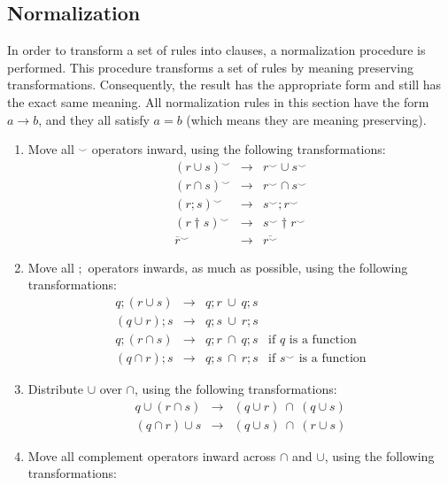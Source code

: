 \documentclass[11pt,a4paper,fleqn,oneside]{article}
\newcommand{\flip}[1]{{#1}^\smallsmile}
\newcommand{\cmpl}[1]{\overline{#1}}
\newcommand{\compose}{;}
\begin{document}
\subsection{Normalization}
	In order to transform a set of rules into clauses,
	a normalization procedure is performed.
	This procedure transforms a set of rules by meaning preserving transformations.
	Consequently, the result has the appropriate form and still has the exact same meaning.
	All normalization rules in this section have the form $a\rightarrow b$,
	and they all satisfy $a=b$ (which means they are meaning preserving).
\begin{enumerate}
\item	Move all $\flip{}$ operators inward, using the following transformations:
  \[\begin{array}{rcl}
	\flip{(r\cup s)}&\rightarrow&\flip{r}\cup\flip{s}\\
	\flip{(r\cap s)}&\rightarrow&\flip{r}\cap\flip{s}\\
	\flip{(r\compose s)}&\rightarrow&\flip{s}\compose\flip{r}\\
	\flip{(r\dagger s)}&\rightarrow&\flip{s}\dagger\flip{r}\\
	\flip{\cmpl{r}}&\rightarrow&\cmpl{\flip{r}}
  \end{array}\]
\item	Move all $\compose$ operators inwards, as much as possible, using the following transformations:
  \[\begin{array}{rcll}
	q\compose(r\cup s)&\rightarrow&q\compose r\ \cup\ q\compose s\\
	(q\cup r)\compose s&\rightarrow&q\compose s\ \cup\ r\compose s\\
	q\compose(r\cap s)&\rightarrow&q\compose r\ \cap\ q\compose s&\text{if $q$ is a function}\\
	(q\cap r)\compose s&\rightarrow&q\compose s\ \cap\ r\compose s&\text{if $\flip{s}$ is a function}
  \end{array}\]
\item	Distribute $\cup$ over $\cap$, using the following transformations:
  \[\begin{array}{rcl}
	q\cup(r\cap s)&\rightarrow&(q\cup r)\ \cap\ (q\cup s)\\
	(q\cap r)\cup s&\rightarrow&(q\cup s)\ \cap\ (r\cup s)
  \end{array}\]
\item	Move all complement operators inward across $\cap$ and $\cup$, using the following transformations:
  \[\begin{array}{rcl}

\end{array}\]
\end{enumerate}
\end{document}
